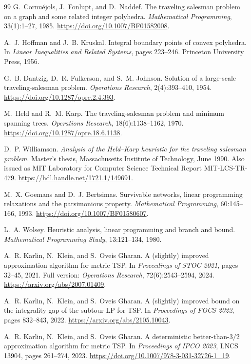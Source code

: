 \documentclass[11pt]{amsart}
\newcommand{\1}{\mathbbm{1}}
\begin{document}
\begin{thebibliography}{99}
G.~Cornu\'ejols, J.~Fonlupt, and D.~Naddef.
The traveling salesman problem on a graph and some related integer
polyhedra.
\emph{Mathematical Programming}, 33(1):1--27, 1985.
\url{https://doi.org/10.1007/BF01582008}.

A.~J. Hoffman and J.~B. Kruskal.
Integral boundary points of convex polyhedra.
In \emph{Linear Inequalities and Related Systems},
pages 223--246. Princeton University Press, 1956.

G.~B. Dantzig, D.~R. Fulkerson, and S.~M. Johnson.
Solution of a large-scale traveling-salesman problem.
\emph{Operations Research}, 2(4):393--410, 1954.
\url{https://doi.org/10.1287/opre.2.4.393}.

M.~Held and R.~M. Karp.
The traveling-salesman problem and minimum spanning trees.
\emph{Operations Research}, 18(6):1138--1162, 1970.
\url{https://doi.org/10.1287/opre.18.6.1138}.

D.~P. Williamson.
\emph{Analysis of the Held--Karp heuristic for the traveling salesman
problem}.
Master's thesis, Massachusetts Institute of Technology, June 1990.
Also issued as MIT Laboratory for Computer Science Technical Report
MIT-LCS-TR-479.
\url{https://hdl.handle.net/1721.1/149691}.

M.~X. Goemans and D.~J. Bertsimas.
Survivable networks, linear programming relaxations and the parsimonious
property.
\emph{Mathematical Programming}, 60:145--166, 1993.
\url{https://doi.org/10.1007/BF01580607}.

L.~A. Wolsey.
Heuristic analysis, linear programming and branch and bound.
\emph{Mathematical Programming Study}, 13:121--134, 1980.

A.~R. Karlin, N.~Klein, and S.~Oveis Gharan.
A (slightly) improved approximation algorithm for metric TSP.
In \emph{Proceedings of STOC 2021}, pages 32--45, 2021.
Full version: \emph{Operations Research}, 72(6):2543--2594, 2024.
\url{https://arxiv.org/abs/2007.01409}.

A.~R. Karlin, N.~Klein, and S.~Oveis Gharan.
A (slightly) improved bound on the integrality gap of the subtour LP for TSP.
In \emph{Proceedings of FOCS 2022}, pages 832--843, 2022.
\url{https://arxiv.org/abs/2105.10043}.

A.~R. Karlin, N.~Klein, and S.~Oveis Gharan.
A deterministic better-than-$3/2$ approximation algorithm for metric TSP.
In \emph{Proceedings of IPCO 2023}, LNCS 13904, pages 261--274, 2023.
\url{https://doi.org/10.1007/978-3-031-32726-1_19}.


\end{thebibliography}
\end{document}

